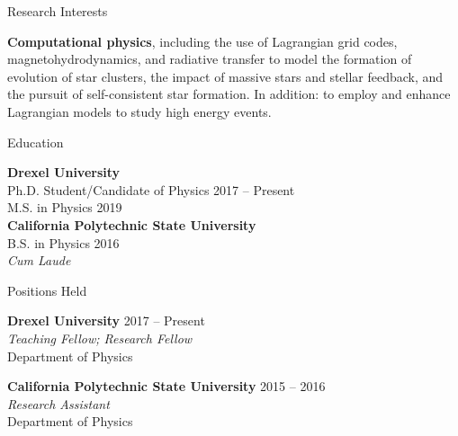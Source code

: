 \documentclass{resume} %
\begin{document}


\begin{rSection}{Research Interests}

\textbf{Computational physics}, including the use of Lagrangian grid codes, magnetohydrodynamics, and radiative transfer to model the formation of evolution of star clusters, the impact of massive stars and stellar feedback, and the pursuit of self-consistent star formation. In addition: to employ and enhance Lagrangian models to study high energy events.

\end{rSection}


\begin{rSection}{Education}

\textbf{Drexel University} \\%
{\color{MidnightBlue} Ph.D.} Student/Candidate of Physics \hfill {2017 -- Present} \\
{\color{MidnightBlue} M.S.} in Physics \hfill{2019}\\
\textbf{California Polytechnic State University} \\%
{\color{MidnightBlue} B.S.} in Physics \hfill{2016}\\
\textit{Cum Laude}

\end{rSection}


\begin{rSection}{Positions Held}

\textbf{Drexel University} \hfill {2017 -- Present} \\
\textit{Teaching Fellow; Research Fellow}\\
Department of Physics

\textbf{California Polytechnic State University} \hfill {2015 -- 2016}\\
\textit{Research Assistant}\\
Department of Physics

\end{rSection}
\end{document}
